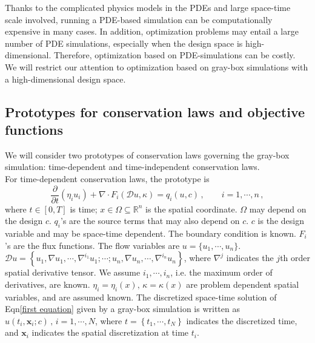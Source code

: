 \documentclass[a4paper,onecolumn]{article}
\theoremstyle{remark}
\begin{document}
\noindent Thanks to the complicated physics models in the PDEs and large space-time scale involved, 
running a PDE-based simulation can be computationally expensive in many cases. 
In addition, optimization problems may entail a large number of 
PDE simulations, especially when the design space is high-dimensional.
Therefore, optimization based on PDE-simulations can be costly.\\

\noindent We will restrict our attention to optimization based on gray-box simulations with a high-dimensional design space.

\subsection{Prototypes for conservation laws and objective functions}
\label{psetup}
\noindent We will consider two prototypes of conservation laws governing the gray-box simulation: 
time-dependent and time-independent conservation laws.\\

\noindent For time-dependent conservation laws, the prototype is
\begin{equation}
    \frac{\partial}{\partial t}\left(\eta_i u_i\right) + \nabla \cdot 
    F_i(\mathcal{D} u, \kappa) 
    = q_i(u,c)\,, \qquad i=1,\cdots, n\,,
    \label{first equation}
\end{equation}
where $t\in[0,T]$ is time;
$x\in \Omega \subseteq \mathbb{R}^{n}$ is the spatial coordinate.
$\Omega$ may depend on the design $c$.
$q_i$'s are the source terms that may also depend on $c$.
$c$ is the design variable and may be space-time dependent.
The boundary condition is known. $F_i$'s are the flux functions. 
The flow variables are 
$u = \{u_1, \cdots, u_n\}$.\\
$\mathcal{D} u = \left\{u_1, \nabla u_1 , \cdots, \nabla^{i_1} u_1; \cdots;
u_n, \nabla u_n,\cdots, \nabla^{i_n} u_n\right\}$, where $\nabla^j$ indicates the $j$th
order spatial derivative tensor. We assume $i_1,\cdots, i_n$, i.e. the maximum 
order of derivatives, are known.
$\eta_i=\eta_i(x), \,\kappa=\kappa(x)$ are 
problem dependent spatial variables, and are assumed known. 
The discretized space-time solution of Eqn\eqref{first equation} given by a gray-box simulation
is written as $\hat{u}(t_i, \mathbf{x}_i; c)\,,\, i=1,\cdots,N$, where 
$t=\left\{t_1,\cdots, t_N\right\}$ indicates the discretized time, and 
$\mathbf{x}_i$ indicates the spatial discretization at time $t_i$.\\
\end{document}

